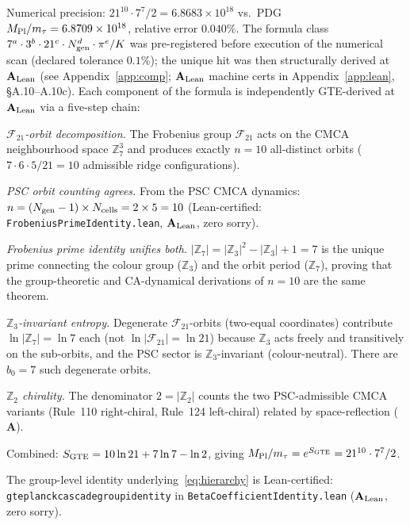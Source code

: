 \documentclass[11pt]{article}
\theoremstyle{remark}
\newcommand{\ZS}{\mathbb{Z}_7}
\newcommand{\ZZ}{\mathbb{Z}}
\newcommand{\lean}[1]{%
  \penalty-100
  \begingroup\def\_{\textunderscore\allowbreak}\texttt{#1}\endgroup}
\newcommand{\FTT}{\mathcal{F}_{21}}
\newcommand{\CatA}{\textbf{A}}
\newcommand{\CatAL}{\ensuremath{\textbf{A}_{\rm Lean}}}
\begin{document}
\noindent
Numerical precision: $21^{10}\cdot 7^7/2 = 6.8683\times10^{18}$
vs.\ PDG $M_{\rm Pl}/m_\tau = 6.8709\times10^{18}$, relative error
$\mathbf{0.040\%}$.
The formula class $7^a\cdot3^b\cdot21^c\cdot N_{\rm gen}^d\cdot\pi^e/K$ was
pre-registered before execution of the numerical scan (declared tolerance $0.1\%$);
the unique hit was then structurally derived at $\CatAL$
(see Appendix~\ref{app:comp}; $\CatAL$ machine certs in Appendix~\ref{app:lean},
\S A.10--A.10c).
Each component of the formula is independently
GTE-derived at $\CatAL$ via a five-step chain:

\begin{description}[leftmargin=1.2cm]
\item[Step 1] \emph{$\FTT$-orbit decomposition.}
  The Frobenius group $\FTT$ acts on the CMCA neighbourhood space $\ZS^3$
  and produces exactly $n=10$ all-distinct orbits
  ($7\cdot6\cdot5/21 = 10$ admissible ridge configurations).
\item[Step 2] \emph{PSC orbit counting agrees.}
  From the PSC CMCA dynamics: $n = (N_{\rm gen}-1)\times N_{\rm cells}
  = 2\times5 = 10$ (Lean-certified:
  \lean{FrobeniusPrimeIdentity.lean}, $\CatAL$, zero sorry).
\item[Step 3] \emph{Frobenius prime identity unifies both.}
  $|\ZS|=|\ZZ_3|^2-|\ZZ_3|+1=7$ is the unique prime connecting the colour
  group ($\ZZ_3$) and the orbit period ($\ZS$), proving that the group-theoretic
  and CA-dynamical derivations of $n=10$ are the same theorem.
\item[Step 4] \emph{$\ZZ_3$-invariant entropy.}
  Degenerate $\FTT$-orbits (two-equal coordinates) contribute $\ln|\ZS|=\ln7$
  each (not $\ln|\FTT|=\ln21$) because $\ZZ_3$ acts freely and transitively on
  the sub-orbits, and the PSC sector is $\ZZ_3$-invariant (colour-neutral).
  There are $b_0=7$ such degenerate orbits.
\item[Step 5] \emph{$\ZZ_2$ chirality.}
  The denominator $2=|\ZZ_2|$ counts the two PSC-admissible CMCA variants
  (Rule~110 right-chiral, Rule~124 left-chiral) related by space-reflection
  ($\CatA$).
\end{description}

Combined: $S_{\rm GTE} = 10\ln21 + 7\ln7 - \ln2$, giving
$M_{\rm Pl}/m_\tau = e^{S_{\rm GTE}} = 21^{10}\cdot7^7/2$.

The group-level identity underlying~\eqref{eq:hierarchy} is Lean-certified:
\lean{gte\_planck\_cascade\_group\_identity} in \lean{BetaCoefficientIdentity.lean}
($\CatAL$, zero sorry).
\end{document}
